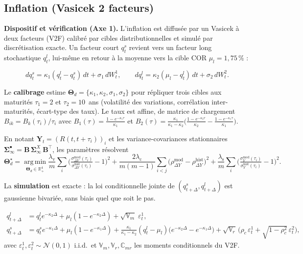 \documentclass[11pt,a4paper]{article}
\begin{document}
\subsection{Inflation (Vasicek 2 facteurs)}

\textbf{Dispositif et vérification (Axe 1).} L'inflation est diffusée par un Vasicek à deux facteurs (V2F) calibré par cibles distributionnelles et simulé par discrétisation exacte. Un facteur court $q_t^{s}$ revient vers un facteur long stochastique $q_t^{l}$, lui-même en retour à la moyenne vers la cible COR $\mu_l=1{,}75\,\%$ :
\begin{definitionbox}
\[
dq_t^{s}=\kappa_1(q_t^{l}-q_t^{s})\,dt+\sigma_1\,dW_t^1,\qquad
dq_t^{l}=\kappa_2(\mu_l-q_t^{l})\,dt+\sigma_2\,dW_t^2 .
\]
\end{definitionbox}

Le \textbf{calibrage} estime $\bm{\Theta}_d=\{\kappa_1,\kappa_2,\sigma_1,\sigma_2\}$ pour répliquer trois cibles aux maturités $\tau_1=2$ et $\tau_2=10$~ans (volatilité des variations, corrélation inter-maturités, écart-type des taux). Le taux est affine, de matrice de chargement $B_{ik}=B_k(\tau_i)/\tau_i$ avec $B_1(\tau)=\tfrac{1-e^{-\kappa_1\tau}}{\kappa_1}$ et $B_2(\tau)=\tfrac{\kappa_1}{\kappa_1-\kappa_2}\big(\tfrac{1-e^{-\kappa_2\tau}}{\kappa_2}-\tfrac{1-e^{-\kappa_1\tau}}{\kappa_1}\big)$.
\label{sec:cibles}
\begin{definitionbox}
En notant $\bm{Y}_t=(R(t,t+\tau_i))_i$ et les variance-covariances stationnaires $\bm{\Sigma}^{\bullet}_\infty=\bm{B}\,\bm{\Sigma}^{X}_\infty\,\bm{B}^\top$, les paramètres résolvent
\[
\bm{\Theta}_d^{\star}=\operatorname*{arg\,min}_{\bm{\Theta}_d\in\mathbb{R}_+^4}
\frac{\lambda_{\mathrm{v}}}{m}\sum_{i}\!\Big(\tfrac{\sigma^{\mathrm{mod}}_{\Delta Y}(\tau_i)}{\sigma^{\mathrm{hist}}_{\Delta Y}(\tau_i)}-1\Big)^2
+\frac{2\lambda_{\mathrm{c}}}{m(m-1)}\sum_{i<j}\!\big(\rho^{\mathrm{mod}}_{\Delta Y}-\rho^{\mathrm{hist}}_{\Delta Y}\big)^2
+\frac{\lambda_{\mathrm{s}}}{m}\sum_{i}\!\Big(\tfrac{\sigma^{\mathrm{mod}}_{Y}(\tau_i)}{\sigma^{\mathrm{hist}}_{Y}(\tau_i)}-1\Big)^2 .
\]
\end{definitionbox}

La \textbf{simulation} est exacte : la loi conditionnelle jointe de $(q^{s}_{t+\Delta},q^{l}_{t+\Delta})$ est gaussienne bivariée, sans biais quel que soit le pas.
\label{sec:exactv2f}
\begin{definitionbox}
\[
\begin{aligned}
q^{l}_{t+\Delta}&=q^{l}_t e^{-\kappa_2\Delta}+\mu_l(1-e^{-\kappa_2\Delta})+\sqrt{\mathbb V_m}\;\varepsilon^{1}_t,\\
q^{s}_{t+\Delta}&=q^{s}_t e^{-\kappa_1\Delta}+\mu_l(1-e^{-\kappa_1\Delta})+\tfrac{\kappa_1}{\kappa_1-\kappa_2}(q^{l}_t-\mu_l)\big(e^{-\kappa_2\Delta}-e^{-\kappa_1\Delta}\big)+\sqrt{\mathbb V_r}\,\big(\rho_c\,\varepsilon^{1}_t+\sqrt{1-\rho_c^2}\,\varepsilon^{2}_t\big),
\end{aligned}
\]
avec $\varepsilon^{1}_t,\varepsilon^{2}_t\sim\mathcal N(0,1)$ i.i.d.\ et $\mathbb V_m,\mathbb V_r,\mathbb C_{mr}$ les moments conditionnels du V2F.
\end{definitionbox}
\end{document}
